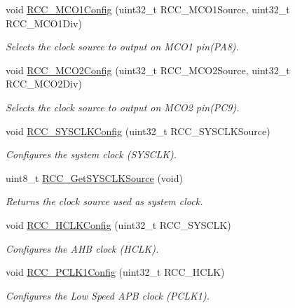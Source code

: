 \begin{DoxyCompactItemize}
void \hyperlink{group___r_c_c_ga15c9ecb6ef015ed008cb28e5b7a50531}{R\+C\+C\+\_\+\+M\+C\+O1\+Config} (uint32\+\_\+t R\+C\+C\+\_\+\+M\+C\+O1\+Source, uint32\+\_\+t R\+C\+C\+\_\+\+M\+C\+O1\+Div)
\begin{DoxyCompactList}\small\item\em Selects the clock source to output on M\+C\+O1 pin(\+P\+A8). \end{DoxyCompactList}\item 
void \hyperlink{group___r_c_c_gaf50f10675b747de60c739e44e5c22aee}{R\+C\+C\+\_\+\+M\+C\+O2\+Config} (uint32\+\_\+t R\+C\+C\+\_\+\+M\+C\+O2\+Source, uint32\+\_\+t R\+C\+C\+\_\+\+M\+C\+O2\+Div)
\begin{DoxyCompactList}\small\item\em Selects the clock source to output on M\+C\+O2 pin(\+P\+C9). \end{DoxyCompactList}\item 
void \hyperlink{group___r_c_c_ga3551a36a8f0a3dc96a74d6b939048337}{R\+C\+C\+\_\+\+S\+Y\+S\+C\+L\+K\+Config} (uint32\+\_\+t R\+C\+C\+\_\+\+S\+Y\+S\+C\+L\+K\+Source)
\begin{DoxyCompactList}\small\item\em Configures the system clock (S\+Y\+S\+C\+LK). \end{DoxyCompactList}\item 
uint8\+\_\+t \hyperlink{group___r_c_c_gaaeb32311c208b2a980841c9c884a41ea}{R\+C\+C\+\_\+\+Get\+S\+Y\+S\+C\+L\+K\+Source} (void)
\begin{DoxyCompactList}\small\item\em Returns the clock source used as system clock. \end{DoxyCompactList}\item 
void \hyperlink{group___r_c_c_ga9d0aec72e236c6cdf3a3a82dfb525491}{R\+C\+C\+\_\+\+H\+C\+L\+K\+Config} (uint32\+\_\+t R\+C\+C\+\_\+\+S\+Y\+S\+C\+LK)
\begin{DoxyCompactList}\small\item\em Configures the A\+HB clock (H\+C\+LK). \end{DoxyCompactList}\item 
void \hyperlink{group___r_c_c_ga448137346d4292985d4e7a61dd1a824f}{R\+C\+C\+\_\+\+P\+C\+L\+K1\+Config} (uint32\+\_\+t R\+C\+C\+\_\+\+H\+C\+LK)
\begin{DoxyCompactList}\small\item\em Configures the Low Speed A\+PB clock (P\+C\+L\+K1). \end{DoxyCompactList}\item 

\end{DoxyCompactItemize}
